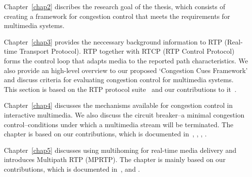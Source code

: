 Chapter~\ref{chap2} discribes the research goal of the thesis, which consists
of creating a framework for congestion control that meets the requirements for
multimedia systems.


Chapter~\ref{chap3} provides the neccessary background information to RTP
(Real-time Transport Protocol). RTP together with RTCP (RTP Control Protocol)
forms the control loop that adapts media to the reported path characteristics.
We also provide an high-level overview to our proposed `Congestion Cues
Framework' and discuss criteria for evaluating congestion control for
multimedia systems. This section is based on the RTP protocol
suite~\cite{rfc3550, rfc4585, rfc3611, rfc5104, rfc5506} and our contributions
to it~\cite{draft.rmcat.evaluate, draft.xr.discard.rle, draft.xr.jb}.


Chapter~\ref{chap4} discusses the mechanisms available for congestion control
in interactive multimedia. We also discuss the circuit breaker--a minimal
congestion control--conditions under which a multimedia stream will be
terminated. The chapter is based on our contributions, which is documented
in~\cite{draft.rtp.cb, control.loops.api}, , ,
.


Chapter~\ref{chap5} discusses using multihoming for real-time media delivery
and introduces Multipath RTP (MPRTP). The chapter is mainly based on our
contributions, which is documented in~\cite{draft.mprtp, draft.mprtp.sdp,
globisch2011architecture, draft.rtcp.overlay}, and .


